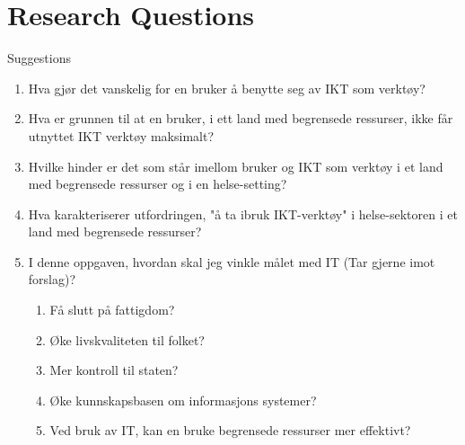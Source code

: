\section{Research Questions}
\large{Suggestions}
\begin{enumerate}
\item Hva gjør det vanskelig for en bruker å benytte seg av IKT som verktøy?
\item Hva er grunnen til at en bruker, i ett land med begrensede ressurser, ikke får utnyttet IKT verktøy maksimalt?
\item Hvilke hinder er det som står imellom bruker og IKT som verktøy i et land med begrensede ressurser og i en helse-setting?
\item Hva karakteriserer utfordringen, "å ta ibruk IKT-verktøy" i helse-sektoren i et land med begrensede ressurser?
\item I denne oppgaven, hvordan skal jeg vinkle målet med IT (Tar gjerne imot forslag)?
	\begin{enumerate}
	\item Få slutt på fattigdom?
	\item Øke livskvaliteten til folket?
	\item Mer kontroll til staten?
	\item Øke kunnskapsbasen om informasjons systemer?
	\item Ved bruk av IT, kan en bruke begrensede ressurser mer effektivt?
	\end{enumerate}
\end{enumerate}